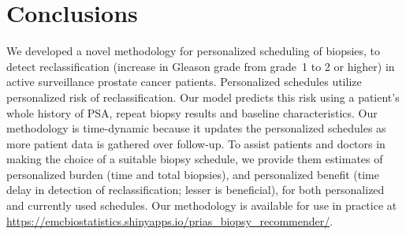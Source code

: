 \section{Conclusions}
We developed a novel methodology for personalized scheduling of biopsies, to detect reclassification (increase in Gleason grade from grade~1 to 2 or higher) in active surveillance prostate cancer patients. Personalized schedules utilize personalized risk of reclassification. Our model predicts this risk using a patient's whole history of PSA, repeat biopsy results and baseline characteristics. Our methodology is time-dynamic because it updates the personalized schedules as more patient data is gathered over follow-up. To assist patients and doctors in making the choice of a suitable biopsy schedule, we provide them estimates of personalized burden (time and total biopsies), and personalized benefit (time delay in detection of reclassification; lesser is beneficial), for both personalized and currently used schedules. Our methodology is available for use in practice at \url{https://emcbiostatistics.shinyapps.io/prias_biopsy_recommender/}.